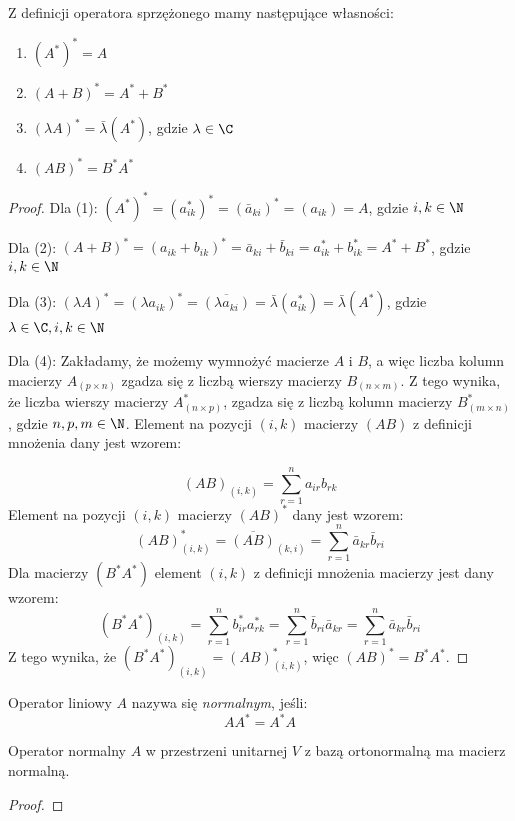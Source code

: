 \begin{theorem}\label{theorem:properties_of_conjugated_operator}
    Z definicji operatora sprzężonego mamy następujące własności:
    \begin{enumerate}[leftmargin=1cm, itemsep=2pt, label=(\arabic*)]
        \item $(A^*)^* = A$
        \item $(A + B)^* = A^* + B^*$
        \item $(\lambda A)^* = \bar{\lambda}(A^*)$, gdzie $\lambda \in \C$
        \item $(AB)^* = B^*A^*$
    \end{enumerate}
\end{theorem}
\begin{proof}
Dla (1): $(A^*)^* = (a^*_{ik})^* = (\bar{a}_{ki})^* = (a_{ik}) = A$, gdzie $i, k \in \N$

Dla (2):
$(A + B)^* = (a_{ik} + b_{ik})^* = \bar{a}_{ki} + \bar{b}_{ki} = a^*_{ik} + b^*_{ik} = A^* + B^*$, gdzie $i, k \in \N$

Dla (3):
$(\lambda A)^* = (\lambda a_{ik})^* = \overline{(\lambda a_{ki})} = \bar{\lambda}(a^*_{ik}) = \bar{\lambda}(A^*)$, gdzie $\lambda \in \C, i, k \in \N$

Dla (4):
Zakładamy, że możemy wymnożyć macierze $A$ i $B$, a więc liczba kolumn macierzy $A_{(p \times n)}$ zgadza się z liczbą wierszy macierzy $B_{(n \times m)}$. Z tego wynika, że liczba wierszy macierzy $A^*_{(n \times p)}$, zgadza się z liczbą kolumn macierzy $B^*_{(m \times n)}$, gdzie $n, p, m \in \N$.
Element na pozycji $(i, k)$ macierzy $(AB)$ z definicji mnożenia dany jest wzorem: 

$$(AB)_{(i, k)} = \sum_{r=1}^{n}{a_{ir}b_{rk}}$$
Element na pozycji $(i, k)$ macierzy $(AB)^*$ dany jest wzorem:
$$(AB)^*_{(i, k)} = \overline{(AB)}_{(k, i)} = \sum_{r=1}^{n}{\bar{a}_{kr}\bar{b}_{ri}}$$
Dla macierzy $(B^*A^*)$ element $(i, k)$ z definicji mnożenia macierzy jest dany wzorem:
$$(B^*A^*)_{(i, k)} = \sum_{r=1}^{n}{b^*_{ir}a^*_{rk}} = \sum_{r=1}^{n}{\bar{b}_{ri}\bar{a}_{kr}} = \sum_{r=1}^{n}{\bar{a}_{kr}\bar{b}_{ri}}$$
Z tego wynika, że $(B^*A^*)_{(i, k)} = (AB)^*_{(i, k)}$, więc $(AB)^* = B^*A^*$.
\end{proof}

\begin{definition}\label{def:complex_normal_operator}
Operator liniowy $A$ nazywa się \textit{normalnym}, jeśli:
$$AA^* = A^*A$$
\end{definition}
\begin{theorem}
    Operator normalny $A$ w przestrzeni unitarnej $V$ z bazą ortonormalną ma macierz normalną.
\end{theorem}
\begin{proof}
\end{proof}

